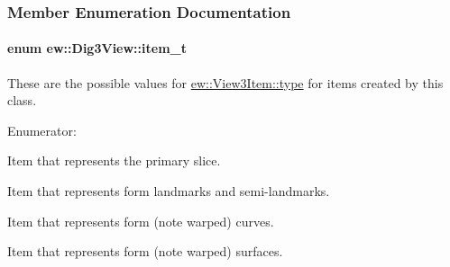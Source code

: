 \subsubsection{Member Enumeration Documentation}
\hypertarget{classew_1_1Dig3View_ac4e4e4036d49a73a3470f7c46057e13a}{
\paragraph[{item\_\-t}]{\setlength{\rightskip}{0pt plus 5cm}enum {\bf ew::Dig3View::item\_\-t}}\hfill}
\label{classew_1_1Dig3View_ac4e4e4036d49a73a3470f7c46057e13a}
These are the possible values for \hyperlink{classew_1_1View3Item_a7e21fcde8f082ba2409bcb2999a4b7fd}{ew::View3Item::type} for items created by this class. \begin{Desc}
\item[Enumerator: ]\par
\begin{description}
\item[{\em 
\hypertarget{classew_1_1Dig3View_ac4e4e4036d49a73a3470f7c46057e13aa12554f487cbf4981a9cf8cf72a668bc7}{
ITEM\_\-SLICE}
\label{classew_1_1Dig3View_ac4e4e4036d49a73a3470f7c46057e13aa12554f487cbf4981a9cf8cf72a668bc7}
}]Item that represents the primary slice. \item[{\em 
\hypertarget{classew_1_1Dig3View_ac4e4e4036d49a73a3470f7c46057e13aa19b28108a6c147a4f67a7ca301a4b9f4}{
ITEM\_\-LANDMARKS}
\label{classew_1_1Dig3View_ac4e4e4036d49a73a3470f7c46057e13aa19b28108a6c147a4f67a7ca301a4b9f4}
}]Item that represents form landmarks and semi-\/landmarks. \item[{\em 
\hypertarget{classew_1_1Dig3View_ac4e4e4036d49a73a3470f7c46057e13aa1921cd87bd7301098b2b318936a61beb}{
ITEM\_\-CURVE}
\label{classew_1_1Dig3View_ac4e4e4036d49a73a3470f7c46057e13aa1921cd87bd7301098b2b318936a61beb}
}]Item that represents form (note warped) curves. \item[{\em 
\hypertarget{classew_1_1Dig3View_ac4e4e4036d49a73a3470f7c46057e13aaae05252997168fd1f936c7d04cfc57e5}{
ITEM\_\-SURFACE}
\label{classew_1_1Dig3View_ac4e4e4036d49a73a3470f7c46057e13aaae05252997168fd1f936c7d04cfc57e5}
}]Item that represents form (note warped) surfaces. \end{description}
\end{Desc}



